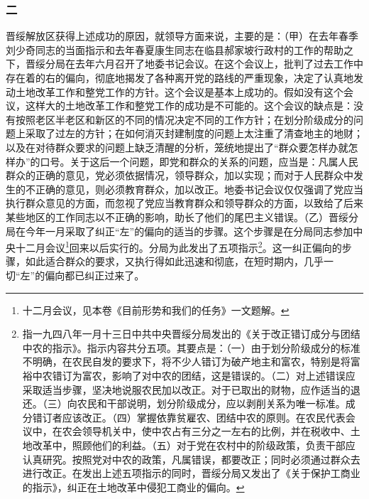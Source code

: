 \documentclass[cn,11pt,chinese]{elegantbook}
\def\myformat#1{\hfil\hfil #1}
\begin{document}
\subsubsection*{\myformat{二}}
晋绥解放区获得上述成功的原因，就领导方面来说，主要的是：（甲）在去年春季刘少奇同志的当面指示和去年春夏康生同志在临县郝家坡行政村的工作的帮助之下，晋绥分局在去年六月召开了地委书记会议。在这个会议上，批判了过去工作中存在着的右的偏向，彻底地揭发了各种离开党的路线的严重现象，决定了认真地发动土地改革工作和整党工作的方针。这个会议是基本上成功的。假如没有这个会议，这样大的土地改革工作和整党工作的成功是不可能的。这个会议的缺点是：没有按照老区半老区和新区的不同的情况决定不同的工作方针；在划分阶级成分的问题上采取了过左的方针；在如何消灭封建制度的问题上太注重了清查地主的地财；以及在对待群众要求的问题上缺乏清醒的分析，笼统地提出了“群众要怎样办就怎样办”的口号。关于这后一个问题，即党和群众的关系的问题，应当是：凡属人民群众的正确的意见，党必须依据情况，领导群众，加以实现；而对于人民群众中发生的不正确的意见，则必须教育群众，加以改正。地委书记会议仅仅强调了党应当执行群众意见的方面，而忽视了党应当教育群众和领导群众的方面，以致给了后来某些地区的工作同志以不正确的影响，助长了他们的尾巴主义错误。（乙）晋绥分局在今年一月采取了纠正“左”的偏向的适当的步骤。这个步骤是在分局同志参加中央十二月会议\footnote[2]{ 十二月会议，见本卷《目前形势和我们的任务》一文题解。}回来以后实行的。分局为此发出了五项指示\footnote[3]{ 指一九四八年一月十三日中共中央晋绥分局发出的《关于改正错订成分与团结中农的指示》。指示内容共分五项。其要点是：（一）由于划分阶级成分的标准不明确，在农民自发的要求下，将不少人错订为破产地主和富农，特别是将富裕中农错订为富农，影响了对中农的团结，这是错误的。（二）对上述错误应采取适当步骤，坚决地说服农民加以改正。对于已取出的财物，应作适当的退还。（三）向农民和干部说明，划分阶级成分，应以剥削关系为唯一标准。成分错订者应该改正。（四）掌握依靠贫雇农、团结中农的原则。在农民代表会议中，在农会领导机关中，使中农占有三分之一左右的比例，并在税收中、土地改革中，照顾他们的利益。（五）对于党在农村中的阶级政策，负责干部应认真研究。按照党对中农的政策，凡属错误，都要改正；同时必须通过群众去进行改正。在发出上述五项指示的同时，晋绥分局又发出了《关于保护工商业的指示》，纠正在土地改革中侵犯工商业的偏向。}。这一纠正偏向的步骤，如此适合群众的要求，又执行得如此迅速和彻底，在短时期内，几乎一切“左”的偏向都已纠正过来了。\\
\end{document}

